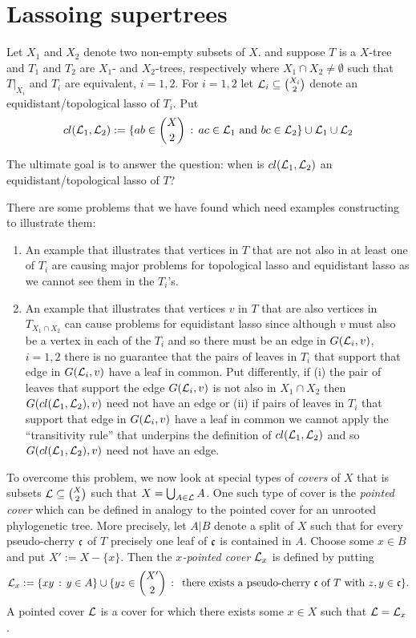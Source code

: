 \section{Lassoing supertrees}

Let $X_1$ and $X_2$ denote two non-empty subsets of $X$.  and suppose $T$ is a
$X$-tree and $T_1$ and $T_2$ are $X_1$- and $X_2$-trees, respectively where
$X_1\cap X_2\not=\emptyset$ such that $T|_{X_i}$ and $T_i$ are equivalent,
$i=1,2$. For $i=1,2$ let ${\mathcal L}_i\subseteq {X_i\choose 2}$ denote an
equidistant/topological lasso of $T_i$. Put
$$
cl({\mathcal L}_1,{\mathcal L}_2):=\{ab\in {X\choose 2}\,:\, ac\in {\mathcal L}_1 
\mbox{ and } bc\in {\mathcal L}_2\} \cup {\mathcal L}_1\cup {\mathcal L}_2
$$ 

The ultimate goal is to answer the question: when is $cl({\mathcal L}_1,{\mathcal L}_2)$ an
equidistant/topological lasso of $T$?

There are some problems that we have found which need examples constructing to
illustrate them:
\begin{enumerate}
\item An example that illustrates that vertices in $T$ that are not also in at
  least one of $T_i$ are causing major problems for topological lasso and
  equidistant lasso as we cannot see them in the $T_i$'s.
\item An example that illustrates that vertices $v$ in $T$ that are also
  vertices in $T_{X_1\cap X_2}$ can cause problems for equidistant lasso since
  although $v$ must also be a vertex in each of the $T_i$ and so there must be
  an edge in $G({\mathcal L}_i,v)$, $i=1,2$ there is no guarantee that the pairs of
  leaves in $T_i$ that support that edge in $G({\mathcal L}_i,v)$ have a leaf in
  common.  Put differently, if (i) the pair of leaves that support the edge
  $G({\mathcal L}_i,v)$ is not also in $X_1\cap X_2$ then $G(cl({\mathcal L}_1,{\mathcal L}_2),v)$ need
  not have an edge or (ii) if pairs of leaves in $T_i$ that support that edge
  in $G({\mathcal L}_i,v)$ have a leaf in common we cannot apply the ``transitivity
  rule'' that underpins the definition of $cl({\mathcal L}_1,{\mathcal L}_2)$ and so
  $G(cl({\mathcal L}_1,{\mathcal L}_2),v)$ need not have an edge.
\end{enumerate}

To overcome this problem, we now look at special types of {\em covers} of $X$
that is subsets ${\mathcal L}\subseteq {X\choose 2}$ such that $X=\bigcup_{A\in
  {\mathcal L}}A$. One such type of cover is the {\em pointed cover} which can be
defined in analogy to the pointed cover for an unrooted phylogenetic
tree. More precisely, let $A|B$ denote a split of $X$ such that for every
pseudo-cherry $\frak c$ of $T$ precisely one leaf of $\frak c$ is contained in
$A$. Choose some $x\in B$ and put $X':=X-\{x\}$. Then the {\em $x$-pointed
  cover} ${\mathcal L}_x$ is defined by putting
$$
{\mathcal L}_x:=\{xy\,:\, y\in A\}\cup
\{yz\in {X'\choose 2}\,:\, 
\mbox{ there exists a pseudo-cherry } \frak c \mbox{ of } T \mbox{ with }
z,y\in \frak c\}.
$$
A pointed cover ${\mathcal L}$ is a cover for which there exists some $x\in X$ such
that ${\mathcal L}={\mathcal L}_x$.

